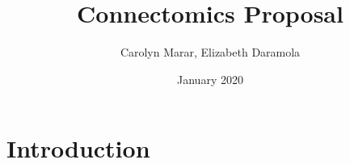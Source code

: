 \documentclass{article}
\title{Connectomics Proposal}
\author{Carolyn Marar, Elizabeth Daramola }
\date{January 2020}
\begin{document}
\maketitle

\section{Introduction}
\end{document}
